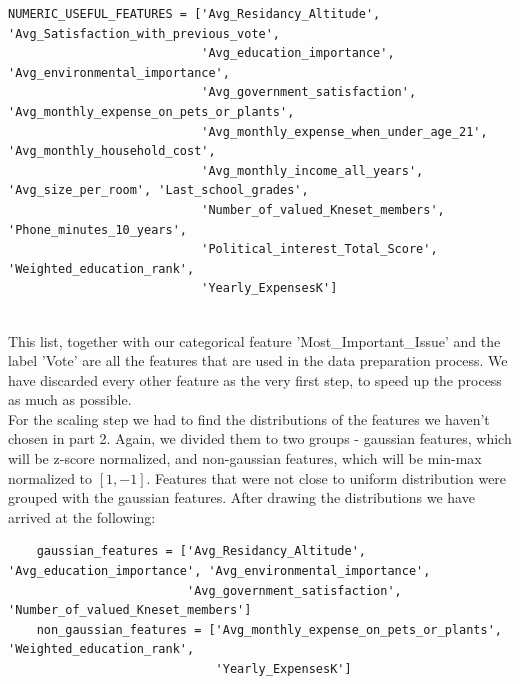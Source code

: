\documentclass[12pt]{article}
\begin{document}
\begin{adjustbox}{max width=\linewidth}
\begin{lstlisting}
NUMERIC_USEFUL_FEATURES = ['Avg_Residancy_Altitude', 'Avg_Satisfaction_with_previous_vote',
                           'Avg_education_importance', 'Avg_environmental_importance',
                           'Avg_government_satisfaction', 'Avg_monthly_expense_on_pets_or_plants',
                           'Avg_monthly_expense_when_under_age_21', 'Avg_monthly_household_cost',
                           'Avg_monthly_income_all_years', 'Avg_size_per_room', 'Last_school_grades',
                           'Number_of_valued_Kneset_members', 'Phone_minutes_10_years',
                           'Political_interest_Total_Score', 'Weighted_education_rank',
                           'Yearly_ExpensesK']
\end{lstlisting}
\end{adjustbox}\\

This list, together with our categorical feature 'Most\_Important\_Issue' and the label 'Vote' are all the features that are used in the data preparation process. We have discarded every other feature as the very first step, to speed up the process as much as possible.\\
For the scaling step we had to find the distributions of the features we haven't chosen in part 2. Again, we divided them to two groups - gaussian features, which will be z-score normalized, and non-gaussian features, which will be min-max normalized to $[1, -1]$. Features that were not close to uniform distribution were grouped with the gaussian features. After drawing the distributions we have arrived at the following:\\

\begin{adjustbox}{max width=\linewidth}
\begin{lstlisting}
    gaussian_features = ['Avg_Residancy_Altitude', 'Avg_education_importance', 'Avg_environmental_importance',
                         'Avg_government_satisfaction', 'Number_of_valued_Kneset_members']
    non_gaussian_features = ['Avg_monthly_expense_on_pets_or_plants', 'Weighted_education_rank',
                             'Yearly_ExpensesK']
\end{lstlisting}
\end{adjustbox}\\
\end{document}
